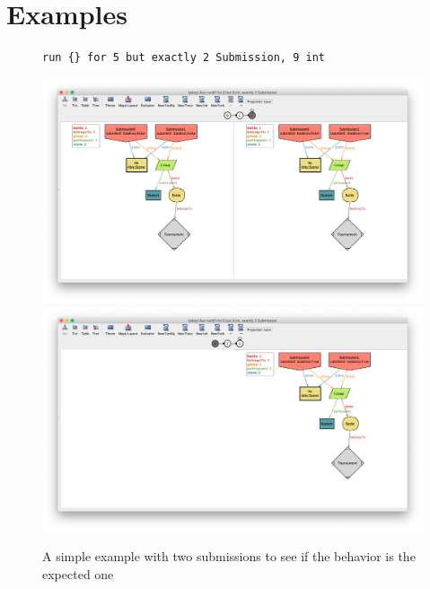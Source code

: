 \section{Examples}
\begin{figure}[h]
\caption{A simple example with two submissions to see if the behavior is the expected one}

\centering
\begin{lstlisting}[language=alloy]
run {} for 5 but exactly 2 Submission, 9 int
\end{lstlisting}

\includegraphics[width=\textwidth]{Images/First example 1.png}
\includegraphics[width=\textwidth]{Images/First example 2.png}

\end{figure}

